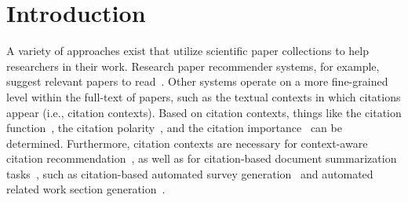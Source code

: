 
\section{Introduction}
A variety of approaches exist that utilize scientific paper collections to help researchers in their work. 
Research paper recommender systems, for example, suggest relevant papers to read~\cite{Beel2016fixed}. Other systems operate on a more fine-grained level within the full-text of papers, such as the textual contexts in which citations appear (i.e., citation contexts). 
Based on citation contexts, things like the citation function~\cite{Teufel2006EMNLP,Teufel2006fixed,Moravcsik1975}, the citation polarity~\cite{GhoshD017,Abu-Jbara2013fixed}, and the citation importance~\cite{Valenzuela2015fixed,Chakraborty2016} can be determined. Furthermore, citation contexts are necessary for context-aware citation recommendation~\cite{He2010WWW,Ebensu2017}, as well as for citation-based document summarization tasks~\cite{Chandrasekaran2019}, such as citation-based automated survey generation~\cite{Mohammad2009} and automated related work section generation~\cite{Jinggiang2007}.

